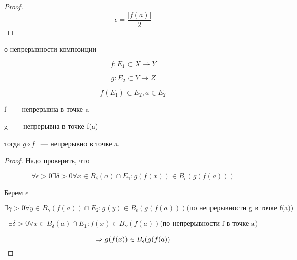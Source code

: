 \begin{proof}
$$\epsilon = \frac{|f(a)|}{2}$$
\end{proof}

\begin{theorem}{о непрерывности композиции}

$$f: E_1 \subset X \to Y$$

$$g:E_2 \subset Y \to Z$$

$$f(E_1) \subset E_2, a \in E_2$$

f ~--- непрерывна в точке a

g ~---  непрерывна в точке f(a)

тогда $g \circ f$ ~--- непрерывно в точке a.

\end{theorem}
\begin{proof}
Надо проверить, что 

$$\forall \epsilon > 0 \exists \delta > 0 \forall x \in B_{\delta}(a) \cap E_1: g(f(x)) \in B_{\epsilon}(g(f(a))) $$

Берем $\epsilon$

$$\exists \gamma > 0 \forall y \in B_{\gamma}(f(a)) \cap E_2: g(y) \in B_{\epsilon}(g(f(a))) \text{(по непрерывности g в точке f(a))}$$

$$\exists \delta > 0 \forall x \in B_{\delta}(a) \cap E_1: f(x) \in B_{\gamma}(f(a)) \text{(по непрерывности f в точке a)}$$

$$\Rightarrow g(f(x)) \in B_{\epsilon}(g(f(a))$$

\end{proof}
